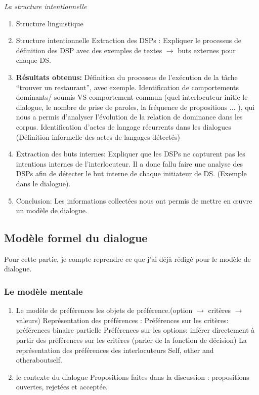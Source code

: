 \documentclass[a4paper,french]{article}
\begin{document}
\par \textit{La structure intentionnelle} 

\begin{enumerate}
	\item Structure linguistique %
	\item Structure intentionnelle %
	\subitem Extraction des DSPs : Expliquer le processus de définition des DSP avec des exemples de textes $\rightarrow$ buts externes pour chaque DS.
	\item \textbf{Résultats obtenus:}
		\subitem Définition du processus de l’exécution de la tâche ``trouver un restaurant'', avec exemple. 
		\subitem Identification de comportements dominants/ soumis VS comportement commun (quel interlocuteur initie le dialogue, le nombre de prise de paroles, la fréquence de propositions ... ), qui nous a permis d'analyser l'évolution de la relation de dominance dans les corpus. 
		\subitem Identification d'actes de langage récurrents dans les dialogues (Définition informelle des actes de langages détectés)
	\item Extraction des buts internes: Expliquer que les DSPs ne capturent pas les intentions internes de l'interlocuteur. Il a donc fallu faire une analyse des DSPs afin de détecter le but interne de chaque initiateur de DS. (Exemple dans le dialogue).
	\item Conclusion: Les informations collectées nous ont permis de mettre en œuvre un modèle de dialogue. 
	
	
\end{enumerate}
\subsection{Modèle formel du dialogue}
\par Pour cette partie, je compte reprendre ce que j'ai déjà rédigé pour le modèle de dialogue. 
\subsubsection{Le modèle mentale}
\begin{enumerate}
\item Le modèle de préférences
 	\subitem les objets de préférence.(option $\rightarrow$ critères $\rightarrow$ valeurs)
 	\subitem Représentation des préférences :
 			\subsubitem Préférences sur les critères: préférences binaire partielle
 			\subsubitem Préférences sur les options: inférer directement à partir des préférences sur les critères (parler de la fonction de décision)
 	\subitem La représentation des préférences des interlocuteurs
 			\subsubitem Self, other and otheraboutself.
\item le contexte du dialogue
 			\subitem Propositions faites dans la discussion : propositions ouvertes, rejetées et acceptée. 	
\end{enumerate}
\end{document}
